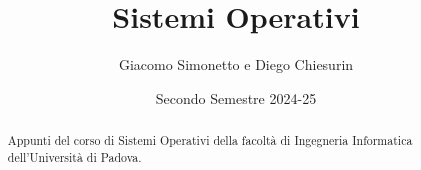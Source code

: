 \documentclass[a4paper]{article}
\title{Sistemi Operativi}
\author{Giacomo Simonetto e Diego Chiesurin}
\date{Secondo Semestre 2024-25}
\begin{document}
\maketitle
\begin{abstract}
	Appunti del corso di Sistemi Operativi della facoltà di Ingegneria Informatica dell'Università di Padova.
\end{abstract}

\newpage

\tableofcontents

\newpage

\end{document}
